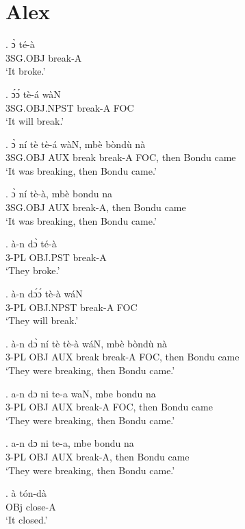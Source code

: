 \documentclass{assets/fieldnotes}
\begin{document}
\section{Alex}

\exg.
ɔ̀             té-à    \\
3SG.OBJ  break-A \\%
`It broke.'


\exg.
ɔ́ɔ́             tè-á      wàN \\
3SG.OBJ.NPST   break-A   FOC \\%
`It will break.'

\exg.
ɔ̀         ní    tè      tè-á      wàN,   mbè    bòndù   nà   \\
3SG.OBJ   AUX   break   break-A   FOC,   then   Bondu   came \\%
`It was breaking, then Bondu came.'

\exg.
ɔ̀         ní    tè-à,      mbè    bondu   na   \\
3SG.OBJ   AUX   break-A,   then   Bondu   came \\%
`It was breaking, then Bondu came.'

\exg.
à-n    dɔ̀        té-à    \\
3-PL   OBJ.PST   break-A \\%
`They broke.'

\exg.
à-n    dɔ́ɔ́        tè-à      wáN \\
3-PL   OBJ.NPST   break-A   FOC \\%
`They will break.'

\exg.
à-n    dɔ̀    ní    tè      tè-à      wáN,   mbè    bòndù   nà   \\
3-PL   OBJ   AUX   break   break-A   FOC,   then   Bondu   came \\%
`They were breaking, then Bondu came.'

\exg.
a-n    dɔ    ni    te-a      waN,   mbe    bondu   na   \\
3-PL   OBJ   AUX   break-A   FOC,   then   Bondu   came \\%
`They were breaking, then Bondu came.'

\exg.
a-n    dɔ    ni    te-a,      mbe    bondu   na   \\
3-PL   OBJ   AUX   break-A,   then   Bondu   came \\%
`They were breaking, then Bondu came.'

\exg.
à             tón-dà  \\
OBj   close-A \\%
`It closed.'
\end{document}
